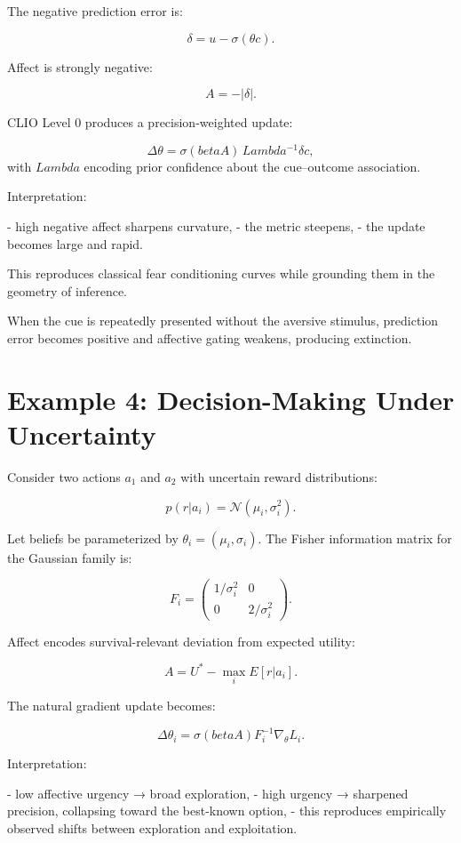 \documentclass[12pt,oneside]{book}
\theoremstyle{plain}
\theoremstyle{definition}
\def\mathbb#1{#1}%
\def\beta{beta}%
\def\Lambda{Lambda}%
\begin{document}
The negative prediction error is:

\[
\delta = u - \sigma(\theta c).
\]

Affect is strongly negative:

\[
A = -|\delta|.
\]

CLIO Level 0 produces a precision-weighted update:

\[
\Delta \theta
=
\sigma(\beta A) \, \Lambda^{-1} \delta c,
\]
with $\Lambda$ encoding prior confidence about the cue–outcome association.

Interpretation:

- high negative affect sharpens curvature,
- the metric steepens,
- the update becomes large and rapid.

This reproduces classical fear conditioning curves while grounding them in the
geometry of inference.

When the cue is repeatedly presented without the aversive stimulus, prediction
error becomes positive and affective gating weakens, producing extinction.

\section{Example 4: Decision-Making Under Uncertainty}

Consider two actions $a_1$ and $a_2$ with uncertain reward distributions:

\[
p(r|a_i) = \mathcal{N}(\mu_i, \sigma_i^2).
\]

Let beliefs be parameterized by $\theta_i = (\mu_i,\sigma_i)$.
The Fisher information matrix for the Gaussian family is:

\[
F_i =
\begin{pmatrix}
1/\sigma_i^2 & 0 \\
0 & 2/\sigma_i^2
\end{pmatrix}.
\]

Affect encodes survival-relevant deviation from expected utility:

\[
A = U^\ast - \max_i \mathbb{E}[r|a_i].
\]

The natural gradient update becomes:

\[
\Delta \theta_i
=
\sigma(\beta A) F_i^{-1} \nabla_\theta L_i.
\]

Interpretation:

- low affective urgency → broad exploration,
- high urgency → sharpened precision, collapsing toward the best-known option,
- this reproduces empirically observed shifts between exploration and
exploitation.
\end{document}
